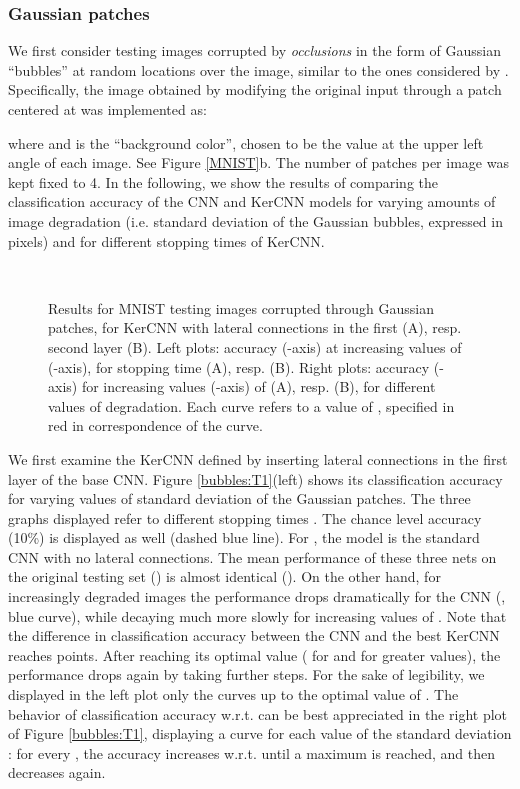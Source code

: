 \documentclass[11pt,oneside,reqno]{amsart}
\renewcommand{\baselinestretch}{1.5} \interfootnotelinepenalty=10000
\begin{document}
 \subsubsection{Gaussian patches} We first consider testing images corrupted by \emph{occlusions} in the form of Gaussian ``bubbles'' at random locations over the image, similar to the ones considered by \citet{tang}. Specifically, the image  obtained by modifying the original input  through a patch centered at  was implemented as:
  
  where  and  is the ``background color'', chosen to be the value at the upper left angle of each image. See Figure \ref{MNIST}b. The number of patches per image was kept fixed to 4. In the following, we show the results of comparing the classification accuracy of the CNN and KerCNN models for varying amounts of image degradation (i.e. standard deviation  of the Gaussian bubbles, expressed in pixels) and for different stopping times of KerCNN.\\
 \begin{figure}[htbp!]
 \centering
 {\renewcommand{\baselinestretch}{0}
 \\
 }
 \caption{Results for MNIST testing images corrupted through Gaussian patches, for KerCNN with lateral connections in the first (A), resp. second layer (B). Left plots: accuracy (-axis) at increasing values of  (-axis), for stopping time  (A), resp.  (B). Right plots: accuracy (-axis) for increasing values (-axis) of  (A), resp.  (B), for different values of degradation. Each curve refers to a value of , specified in red in correspondence of the curve.}\label{bubbles}
 \end{figure}
 
 We first examine the KerCNN defined by inserting lateral connections in the first layer of the base CNN. Figure \ref{bubbles:T1}(left) shows its classification accuracy for varying values of standard deviation  of the Gaussian patches. The three graphs displayed refer to different stopping times . The chance level accuracy (10\%) is displayed as well (dashed blue line). For , the model is the standard CNN with no lateral connections. The mean performance of these three nets on the original testing set () is almost identical (). On the other hand, for increasingly degraded images the performance drops dramatically for the CNN (, blue curve), while decaying much more slowly for increasing values of . Note that the difference in classification accuracy between the CNN and the best KerCNN reaches  points.
 After reaching its optimal value ( for  and  for greater values), the performance drops again by taking further steps. For the sake of legibility, we displayed in the left plot only the curves up to the optimal value of . The behavior of classification accuracy w.r.t.  can be best appreciated in the right plot of Figure \ref{bubbles:T1}, displaying a curve for each value of the standard deviation : for every , the accuracy increases w.r.t.  until a maximum is reached, and then decreases again.\\
 
\end{document}
